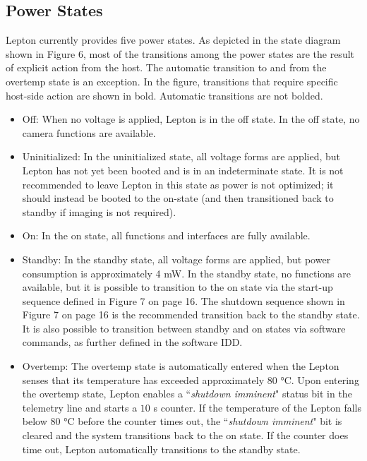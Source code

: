 \subsection{Power States}
\label{ssec:powerstate}
Lepton currently provides five power states. As depicted in the state diagram
shown in Figure 6, most of the transitions among the power states are the result
of explicit action from the host. The automatic transition to and from the
overtemp state is an exception. In the figure, transitions that require specific
host-side action are shown in bold. Automatic transitions are not bolded.
%
\begin{itemize}
    \item Off: When no voltage is applied, Lepton is in the off
state. In the off state, no camera functions are available.
    \item Uninitialized:
In the uninitialized state, all voltage forms are applied, but Lepton has not
yet been booted and is in an indeterminate state. It is not recommended to leave
Lepton in this state as power is not optimized; it should instead be booted to
the on-state (and then transitioned back to standby if imaging is not required).
    \item On: In the on state, all functions and interfaces are fully available.
    \item Standby: In the standby state, all voltage forms are applied, but power
consumption is approximately 4 \si{\milli\watt}. In the standby state, no
functions are available, but it is possible to transition to the on state via
the start-up sequence defined in Figure 7 on page 16. The shutdown sequence
shown in Figure 7 on page 16 is the recommended transition back to the standby
state. It is also possible to transition between standby and on states via
software commands, as further defined in the software IDD.
    \item Overtemp: The
overtemp state is automatically entered when the Lepton senses that its
temperature has exceeded approximately $80$ \si{\celsius}. Upon entering the
overtemp state, Lepton enables a ``\emph{shutdown imminent}" status bit in the
telemetry line and starts a $10$ \si{\second} counter. If the temperature of the
Lepton falls below $80$ \si{\celsius} before the counter times out, the
``\emph{shutdown imminent}" bit is cleared and the system transitions back to
the on state. If the counter does time out, Lepton automatically transitions to
the standby state. \end{itemize}
%
